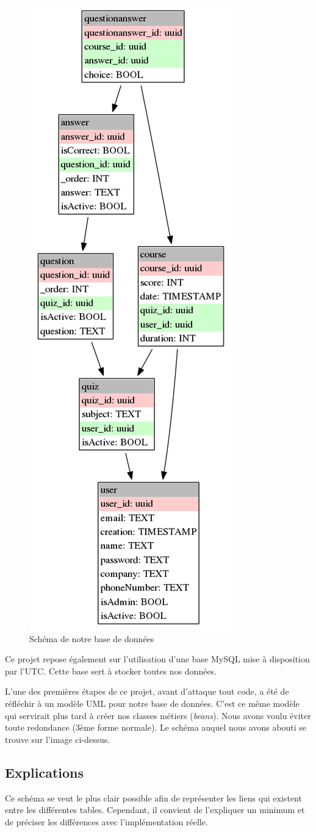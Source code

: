 \begin{figure}[H]
    \centering\includegraphics[width=.4\textwidth]{images/db.png}
    \caption{Schéma de notre base de données}
\end{figure}

Ce projet repose également sur l'utilisation d'une base MySQL mise à disposition par l'UTC. Cette base sert à stocker toutes nos données.

\medskip

L'une des premières étapes de ce projet, avant d'attaque tout code, a été de réfléchir à un modèle UML pour notre base de données. C'est ce même modèle qui servirait plus tard à créer nos classes métiers (\textit{beans}). Nous avons voulu éviter toute redondance (3ème forme normale). Le schéma auquel nous avons abouti se trouve sur l'image ci-dessus.

\subsection{Explications}

Ce schéma se veut le plus clair possible afin de représenter les liens qui existent entre les différentes tables. Cependant, il convient de l'expliquer un minimum et de préciser les différences avec l'implémentation réelle.

